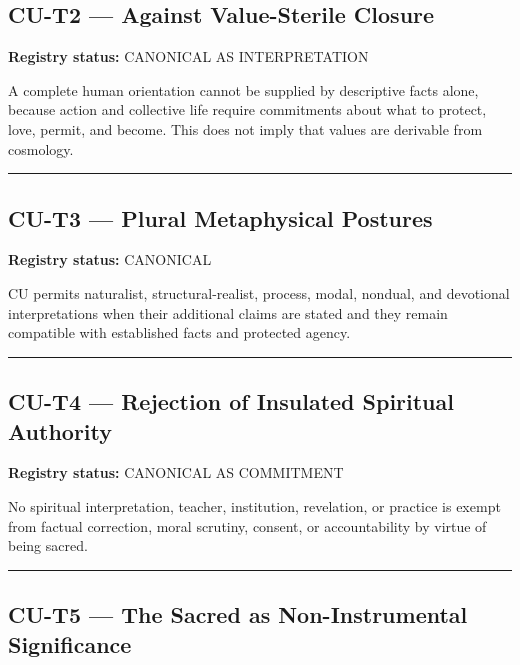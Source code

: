\documentclass[
  11pt,
]{article}
\begin{document}
\subsection{CU-T2 --- Against Value-Sterile
Closure}\label{cu-t2-against-value-sterile-closure}

\textbf{Registry status:} CANONICAL AS INTERPRETATION

A complete human orientation cannot be supplied by descriptive facts
alone, because action and collective life require commitments about what
to protect, love, permit, and become. This does not imply that values
are derivable from cosmology.

\begin{center}\rule{0.5\linewidth}{0.5pt}\end{center}

\subsection{CU-T3 --- Plural Metaphysical
Postures}\label{cu-t3-plural-metaphysical-postures}

\textbf{Registry status:} CANONICAL

CU permits naturalist, structural-realist, process, modal, nondual, and
devotional interpretations when their additional claims are stated and
they remain compatible with established facts and protected agency.

\begin{center}\rule{0.5\linewidth}{0.5pt}\end{center}

\subsection{CU-T4 --- Rejection of Insulated Spiritual
Authority}\label{cu-t4-rejection-of-insulated-spiritual-authority}

\textbf{Registry status:} CANONICAL AS COMMITMENT

No spiritual interpretation, teacher, institution, revelation, or
practice is exempt from factual correction, moral scrutiny, consent, or
accountability by virtue of being sacred.

\begin{center}\rule{0.5\linewidth}{0.5pt}\end{center}

\subsection{CU-T5 --- The Sacred as Non-Instrumental
Significance}\label{cu-t5-the-sacred-as-non-instrumental-significance}
\end{document}

